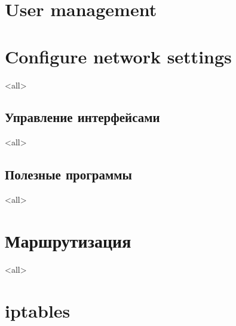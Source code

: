 \section{User management}

\section{Configure network settings}
\mode<all>{}

\subsection{Управление интерфейсами}
\mode<all>{}

\subsection{Полезные программы}
\mode<all>{}

\section{Маршрутизация}
\mode<all>{}

\section{iptables}


